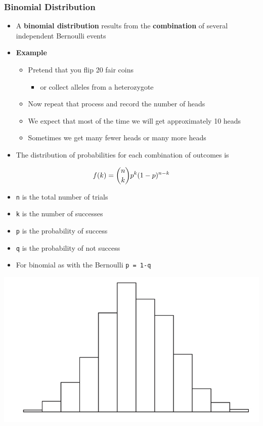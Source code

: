 \documentclass[]{book}
\providecommand{\tightlist}{%
  \setlength{\itemsep}{0pt}\setlength{\parskip}{0pt}}
\begin{document}
\hypertarget{binomial-distribution}{%
\subsubsection{\texorpdfstring{\textbf{Binomial Distribution}}{Binomial Distribution}}\label{binomial-distribution}}

\begin{itemize}
\item
  A \textbf{binomial distribution} results from the \textbf{combination} of several independent Bernoulli events
\item
  \textbf{Example}

  \begin{itemize}
  \tightlist
  \item
    Pretend that you flip 20 fair coins

    \begin{itemize}
    \tightlist
    \item
      or collect alleles from a heterozygote
    \end{itemize}
  \item
    Now repeat that process and record the number of heads
  \item
    We expect that most of the time we will get approximately 10 heads
  \item
    Sometimes we get many fewer heads or many more heads
  \end{itemize}
\item
  The distribution of probabilities for each combination of outcomes is
\end{itemize}

\[\large f(k) = {n \choose k} p^{k} (1-p)^{n-k}\]

\begin{itemize}
\tightlist
\item
  \texttt{n} is the total number of trials
\item
  \texttt{k} is the number of successes
\item
  \texttt{p} is the probability of success
\item
  \texttt{q} is the probability of not success
\item
  For binomial as with the Bernoulli \texttt{p\ =\ 1-q}
\end{itemize}

\begin{center}\includegraphics[width=1\linewidth]{images/week_2.003} \end{center}
\end{document}
